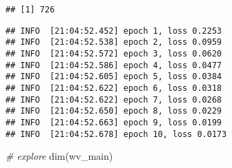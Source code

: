 \documentclass[
]{article}
\newenvironment{Shaded}{\begin{snugshade}}{\end{snugshade}}
\newcommand{\AttributeTok}[1]{\textcolor[rgb]{0.77,0.63,0.00}{#1}}
\newcommand{\CommentTok}[1]{\textcolor[rgb]{0.56,0.35,0.01}{\textit{#1}}}
\newcommand{\DecValTok}[1]{\textcolor[rgb]{0.00,0.00,0.81}{#1}}
\newcommand{\DocumentationTok}[1]{\textcolor[rgb]{0.56,0.35,0.01}{\textbf{\textit{#1}}}}
\newcommand{\FloatTok}[1]{\textcolor[rgb]{0.00,0.00,0.81}{#1}}
\newcommand{\FunctionTok}[1]{\textcolor[rgb]{0.00,0.00,0.00}{#1}}
\newcommand{\NormalTok}[1]{#1}
\newcommand{\OtherTok}[1]{\textcolor[rgb]{0.56,0.35,0.01}{#1}}
\newcommand{\SpecialCharTok}[1]{\textcolor[rgb]{0.00,0.00,0.00}{#1}}
\begin{document}
\begin{verbatim}
## [1] 726
\end{verbatim}

\begin{Shaded}
\end{Shaded}

\begin{verbatim}
## INFO  [21:04:52.452] epoch 1, loss 0.2253 
## INFO  [21:04:52.538] epoch 2, loss 0.0959 
## INFO  [21:04:52.572] epoch 3, loss 0.0620 
## INFO  [21:04:52.586] epoch 4, loss 0.0477 
## INFO  [21:04:52.605] epoch 5, loss 0.0384 
## INFO  [21:04:52.622] epoch 6, loss 0.0318 
## INFO  [21:04:52.622] epoch 7, loss 0.0268 
## INFO  [21:04:52.650] epoch 8, loss 0.0229 
## INFO  [21:04:52.663] epoch 9, loss 0.0199 
## INFO  [21:04:52.678] epoch 10, loss 0.0173
\end{verbatim}

\begin{Shaded}
\begin{Highlighting}[]
\CommentTok{\# explore}
\FunctionTok{dim}\NormalTok{(wv\_main)}
\end{Highlighting}
\end{Shaded}
\end{document}
